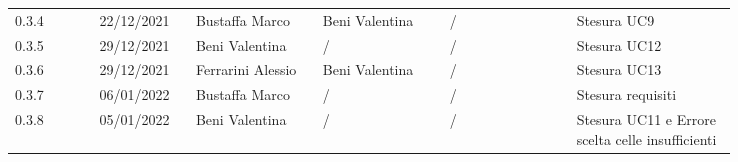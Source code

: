 {\begin{tabular}{p{0.10\linewidth}p{0.10\linewidth}p{0.15\linewidth}p{0.15\linewidth}p{0.15\linewidth}p{0.19\linewidth}}
	\rowcolor[RGB]{233, 245, 206}
	0.3.4 & 22/12/2021 & Bustaffa Marco& Beni Valentina &/& Stesura UC9\\
	\rowcolor[RGB]{216, 235, 171}
	0.3.5 & 29/12/2021 & Beni Valentina& / &/& Stesura UC12\\
	\rowcolor[RGB]{233, 245, 206}
	0.3.6 & 29/12/2021 & Ferrarini Alessio& Beni Valentina &/& Stesura UC13\\
	\rowcolor[RGB]{216, 235, 171}
	0.3.7 & 06/01/2022 & Bustaffa Marco& / & /& Stesura requisiti\\
	\rowcolor[RGB]{233, 245, 206}
	0.3.8 & 05/01/2022 & Beni Valentina& / &/& Stesura UC11 e Errore scelta celle insufficienti\\
\end{tabular}
}
